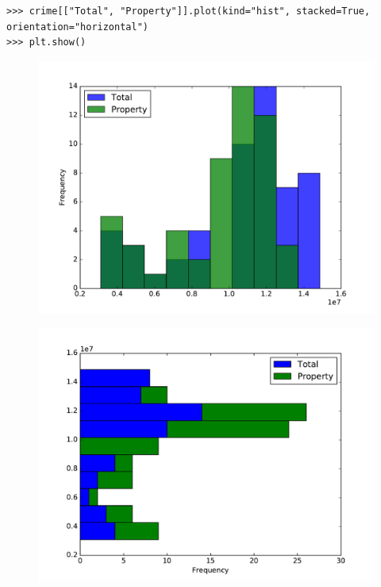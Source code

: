 \documentclass[12pt]{article}
\begin{document}
\begin{lstlisting}
>>> crime[["Total", "Property"]].plot(kind="hist", stacked=True, orientation="horizontal")
>>> plt.show()
\end{lstlisting}

\begin{figure}[H] %
    \centering
    \begin{minipage}[b]{.48\textwidth}
    	 \includegraphics[width=\textwidth]{hist3.pdf}
	 \label{fig:overlap_hist}
    \end{minipage}
    \quad
    \begin{minipage}[b]{.48\textwidth}
    	\includegraphics[width=\textwidth]{hist4.pdf}
	\label{fig:stacked_hist}
    \end{minipage}
\end{figure}
\end{document}
